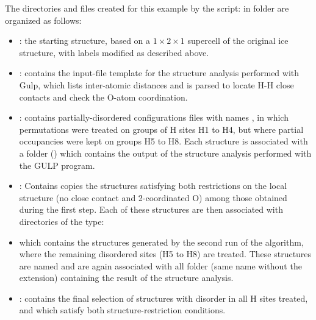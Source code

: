 \documentclass[a4paper,10pt]{article}
\begin{document}
The directories and files created for this example by the script:  in folder  are organized as follows:
\begin{itemize}
 \item {}: the starting structure, based on a $1\times2\times1$ supercell of the original ice  structure, with labels modified as described above.
 \item {}: contains the input-file template for the structure analysis performed with Gulp, which lists inter-atomic distances and is parsed to locate H-H close contacts and check the O-atom coordination.
 \item {}: contains partially-disordered configurations files with names , in which permutations were treated on groups of H sites H1 to H4, but where partial occupancies were kept on groups H5 to H8. Each structure is associated with a folder () which contains the output of the structure analysis performed with the GULP program.
 \item {}: Contains copies the structures satisfying both restrictions on the local structure (no  close contact and 2-coordinated O) among those obtained during the first step. Each of these structures are then associated with directories of the type:
 \item {} which contains the structures generated by the second run of the algorithm, where the remaining disordered sites (H5 to H8) are treated. These structures are named  and are again associated with all folder (same name without the extension) containing the result of the structure analysis.  
 \item {}: contains the final selection of structures with disorder in all H sites treated, and which satisfy both structure-restriction conditions.
\end{itemize}
\end{document}
